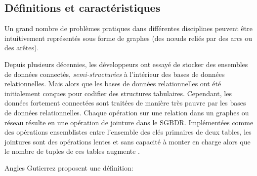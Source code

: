 \subsection{Définitions et caractéristiques}
\label{sec:graphdb-defs}

Un grand nombre de problèmes pratiques dans différentes disciplines
peuvent être intuitivement représentés sous forme de graphes (des
nœuds reliés par des arcs ou des arêtes).\medskip

Depuis plusieurs décennies, les développeurs ont essayé de stocker des
ensembles de données connectés, \textit{semi-structurées} à
l'intérieur des bases de données relationnelles. Mais alors que les
bases de données relationnelles ont été initialement conçues pour
codifier des structures tabulaires. Cependant, les données fortement
connectées sont traitées de manière très pauvre par les bases de
données relationnelles. Chaque opération sur une relation dans un
graphes ou réseau résulte en une opération de jointure dans le
\acrshort{SGBDR}. Implémentées comme des opérations ensemblistes entre
l'ensemble des clés primaires de deux tables, les jointures sont des
opérations lentes et sans capacité à monter en charge alors que le
nombre de tuples de ces tables augmente
\cite{robinson2013graph}.\medskip


Angles Gutierrez \cite{angles2008survey} proposent une définition:







